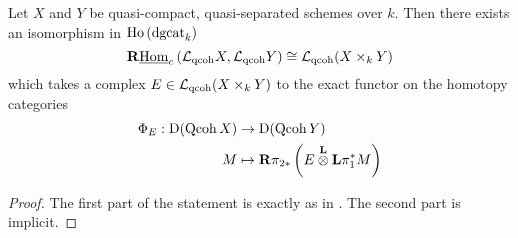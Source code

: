 \begin{theorem}
  Let \(X\) and \(Y\) be quasi-compact, quasi-separated schemes over \(k\). Then there exists an isomorphism in \(\operatorname{Ho}\left(\operatorname{dgcat}_k\right)\)
  \begin{displaymath}
    \mathbf{R}\underline{\operatorname{Hom}}_c\left(\mathcal L_{\operatorname{qcoh}} X,\mathcal L_{\operatorname{qcoh}} Y\right) \cong \mathcal L_{\operatorname{qcoh}} (X \times_k Y)
  \end{displaymath}
  which takes a complex \(E \in \mathcal L_{\operatorname{qcoh}} (X \times_k Y)\) to the exact functor on the homotopy categories
  \begin{align*}
    \Phi_E : \mathrm{D}(\operatorname{Qcoh}X) & \to \mathrm{D}(\operatorname{Qcoh}Y) \\
    M & \mapsto \mathbf{R}\pi_{2 \ast} \left( E \overset{\mathbf{L}}{\otimes} \mathbf{L}\pi_1^\ast M \right)
  \end{align*}
\end{theorem}

\begin{proof}
  The first part of the statement is exactly as in \cite{Toen07}. The second part is implicit. 
\end{proof}
